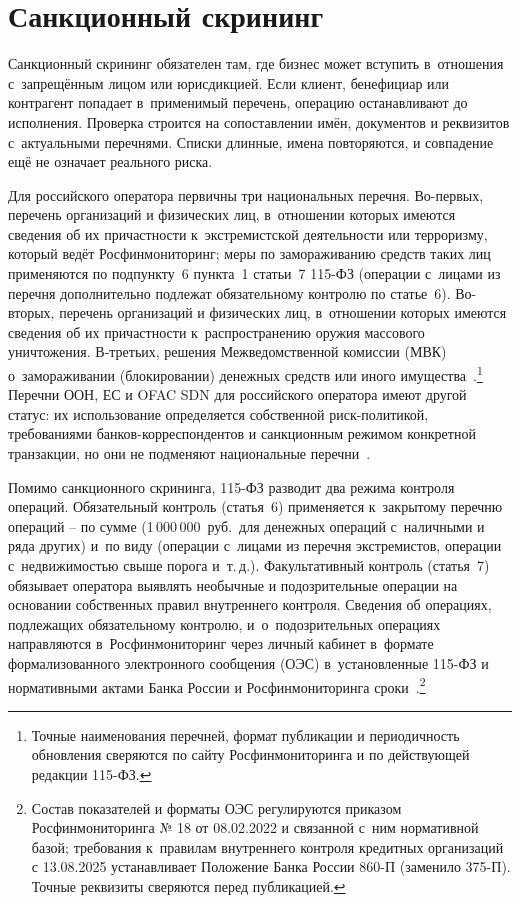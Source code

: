 \section{Санкционный скрининг}\label{sec:compliance-sanctions}

Санкционный скрининг обязателен там, где бизнес может вступить
в~отношения с~запрещённым лицом или юрисдикцией. Если клиент,
бенефициар или контрагент попадает в~применимый перечень, операцию
останавливают до исполнения. Проверка строится на сопоставлении
имён, документов и реквизитов с~актуальными перечнями. Списки
длинные, имена повторяются, и совпадение ещё не означает реального
риска.

Для российского оператора первичны три национальных
перечня. Во-первых, перечень организаций и физических лиц,
в~отношении которых имеются сведения об их причастности
к~экстремистской деятельности или терроризму, который ведёт
Росфинмониторинг; меры по замораживанию средств таких лиц
применяются по подпункту~6 пункта~1 статьи~7 115-ФЗ
(операции с~лицами из перечня дополнительно подлежат
обязательному контролю по статье~6). Во-вторых, перечень
организаций и физических лиц, в~отношении которых имеются
сведения об их причастности к~распространению оружия
массового уничтожения. В-третьих, решения Межведомственной
комиссии (МВК) о~замораживании (блокировании) денежных
средств или иного имущества~\cite{rosfinmonitoring-lists,fz-115,cbr-mvk}.\footnote{Точные
наименования перечней, формат публикации и периодичность
обновления сверяются по сайту Росфинмониторинга и по
действующей редакции 115-ФЗ.} Перечни ООН, ЕС и OFAC SDN
для российского оператора имеют другой статус: их использование
определяется собственной риск-политикой, требованиями
банков-корреспондентов и санкционным режимом конкретной
транзакции, но они не подменяют национальные
перечни~\cite{ofac-sanctions-list-service,eu-sanctions-info,unsc-consolidated-list}.

Помимо санкционного скрининга, 115-ФЗ разводит два режима
контроля операций. Обязательный контроль (статья~6) применяется
к~закрытому перечню операций -- по сумме (1\,000\,000~руб.\
для денежных операций с~наличными и ряда других) и~по виду
(операции с~лицами из перечня экстремистов, операции
с~недвижимостью свыше порога и~т.\,д.). Факультативный контроль
(статья~7) обязывает оператора выявлять необычные
и подозрительные операции на основании собственных правил
внутреннего контроля. Сведения об операциях, подлежащих
обязательному контролю, и~о~подозрительных операциях
направляются в~Росфинмониторинг через личный кабинет в~формате
формализованного электронного сообщения (ОЭС) в~установленные
115-ФЗ и нормативными актами Банка России и
Росфинмониторинга сроки~\cite{fz-115,cbr-860p,rosfinmonitoring-oes}.\footnote{Состав
показателей и форматы ОЭС регулируются приказом Росфинмониторинга
№ 18 от 08.02.2022 и связанной с~ним нормативной базой;
требования к~правилам внутреннего контроля кредитных организаций
с 13.08.2025 устанавливает Положение Банка России 860-П
(заменило 375-П). Точные реквизиты сверяются перед публикацией.}


